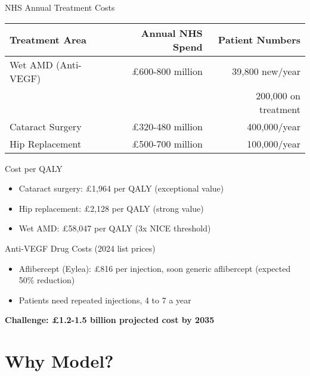 \documentclass[10pt,aspectratio=169]{beamer}
\begin{document}
\begin{frame}{NHS Annual Treatment Costs}
\small %
\begin{table}
\centering
\begin{tabular}{lrr}
\toprule
Treatment Area & Annual NHS Spend & Patient Numbers \\
\midrule
\alert{Wet AMD (Anti-VEGF)} & \alert{£600-800 million} & 39,800 new/year \\
& & ~200,000 on treatment \\
Cataract Surgery & £320-480 million & 400,000/year \\
Hip Replacement & £500-700 million & 100,000/year \\
\bottomrule
\end{tabular}
\end{table}

\vspace{0.2cm} %
\begin{alertblock}{Cost per QALY}
\begin{itemize}
    \item Cataract surgery: £1,964 per QALY (exceptional value)
    \item Hip replacement: £2,128 per QALY (strong value)
    \item \alert{Wet AMD: £58,047 per QALY (3x NICE threshold)}
\end{itemize}
\end{alertblock}

\vspace{0.2cm} %
\begin{block}{Anti-VEGF Drug Costs (2024 list prices)}
\begin{itemize}
    \item Aflibercept (Eylea): £816 per injection, soon generic aflibercept (expected 50\% reduction)
    \item Patients need repeated injections, 4 to 7 a year 
\end{itemize}
\end{block}

\centering
\textbf{Challenge: £1.2-1.5 billion projected cost by 2035}
\end{frame}

\section{Why Model?}
\end{document}
